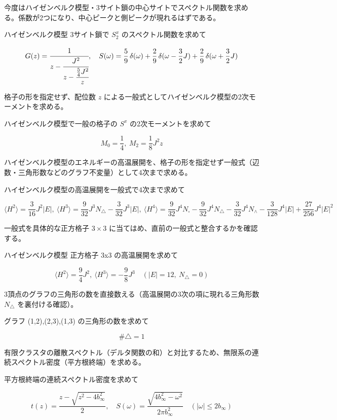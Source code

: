 \documentclass[dvipdfmx,a4paper,11pt]{jsarticle}
\begin{document}
今度はハイゼンベルク模型・3サイト鎖の中心サイトでスペクトル関数を求める。係数が2つになり、中心ピークと側ピークが現れるはずである。

ハイゼンベルク模型 3サイト鎖で $S^x_2$ のスペクトル関数を求めて

\begin{equation}
  G(z) = \cfrac{1}{z - \cfrac{J^{2}}{z - \cfrac{\frac{5}{4} J^{2}}{z}}},\quad S(\omega) = \frac{5}{9}\,\delta(\omega) + \frac{2}{9}\,\delta(\omega - \frac{3}{2} J) + \frac{2}{9}\,\delta(\omega + \frac{3}{2} J)
  \label{eq:E6}
\end{equation}

格子の形を指定せず、配位数 $z$ による一般式としてハイゼンベルク模型の2次モーメントを求める。

ハイゼンベルク模型で一般の格子の $S^x$ の2次モーメントを求めて

\begin{equation}
  M_0 = \frac{1}{4},\ M_2 = \frac{1}{8} J^{2} z
  \label{eq:E7}
\end{equation}

ハイゼンベルク模型のエネルギーの高温展開を、格子の形を指定せず一般式（辺数・三角形数などのグラフ不変量）として4次まで求める。

ハイゼンベルク模型の高温展開を一般式で4次まで求めて

\begin{equation}
  \langle H^2 \rangle = \frac{3}{16} J^{2} |E|,\ \langle H^3 \rangle = \frac{9}{32} J^{3} N_\triangle - \frac{3}{32} J^{3} |E|,\ \langle H^4 \rangle = \frac{9}{32} J^{4} N_\square - \frac{9}{32} J^{4} N_\triangle - \frac{3}{32} J^{4} N_\wedge - \frac{3}{128} J^{4} |E| + \frac{27}{256} J^{4} |E|^{2}
  \label{eq:E8}
\end{equation}

一般式を具体的な正方格子 $3\times3$ に当てはめ、直前の一般式と整合するかを確認する。

ハイゼンベルク模型 正方格子 3x3 の高温展開を求めて

\begin{equation}
  \langle H^2 \rangle = \frac{9}{4} J^{2},\ \langle H^3 \rangle = -\frac{9}{8} J^{3} \quad (|E| = 12,\ N_\triangle = 0)
  \label{eq:E9}
\end{equation}

3頂点のグラフの三角形の数を直接数える（高温展開の3次の項に現れる三角形数 $N_\triangle$ を裏付ける確認）。

グラフ (1,2),(2,3),(1,3) の三角形の数を求めて

\begin{equation}
  \#\triangle = 1
  \label{eq:E10}
\end{equation}

有限クラスタの離散スペクトル（デルタ関数の和）と対比するため、無限系の連続スペクトル密度（平方根終端）を求める。

平方根終端の連続スペクトル密度を求めて

\begin{equation}
  t(z) = \frac{z - \sqrt{z^2 - 4 b_\infty^2}}{2},\quad S(\omega) = \frac{\sqrt{4 b_\infty^2 - \omega^2}}{2\pi b_\infty^2}\quad (|\omega| \le 2 b_\infty)
  \label{eq:E11}
\end{equation}
\end{document}
